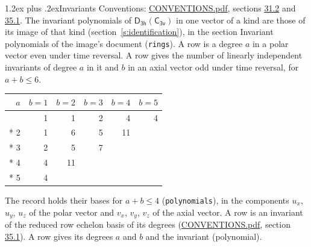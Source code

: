 \documentclass[10pt,a4paper]{article}
\makeatletter
\renewcommand\section{\@startsection{section}{1}{\z@}{-3ex plus -1ex minus -.2ex}%
  {1.2ex plus .2ex}{\normalfont\large\sffamily\bfseries\color{parttitle}}}
\numberwithin{equation}{section}
\newcommand{\grp}[1]{\mathsf{#1}}
\makeatother
\begin{document}
\section{Invariants}\label{s:invariants}
Conventions: \href{../../CONVENTIONS.pdf}{CONVENTIONS.pdf}, sections \href{../../CONVENTIONS.pdf\#conv.31.2}{31.2} and \href{../../CONVENTIONS.pdf\#conv.35.1}{35.1}.
The invariant polynomials of $\grp{D_{3h}}(\grp{C_{3v}})$ in one vector of a kind are those of its image of that kind (section~\ref{s:identification}), in the section Invariant polynomials of the image's document (\texttt{rings}).
\leavevmode\label{n:index.degree.polar}\label{n:index.degree.axial}A row is a degree $a$ in a polar vector even under time reversal. A row gives the number of linearly independent invariants of degree $a$ in it and $b$ in an axial vector odd under time reversal, for $a + b \le 6$.
{\small\begin{longtable}{@{}rrrrrr@{}}\toprule
$a$ & $b = 1$ & $b = 2$ & $b = 3$ & $b = 4$ & $b = 5$\\\midrule\endhead
\bottomrule\endfoot\endlastfoot
1 & 1 & 1 & 2 & 4 & 4\\*
2 & 1 & 6 & 5 & 11 & \\*
3 & 2 & 5 & 7 &  & \\*
4 & 4 & 11 &  &  & \\*
5 & 4 &  &  &  & \\
\bottomrule\end{longtable}}
\leavevmode\label{n:local.component.polar}\label{n:local.component.axial}The record holds their bases for $a + b \le 4$ (\texttt{polynomials}), in the components $u_{x}$, $u_{y}$, $u_{z}$ of the polar vector and $v_{x}$, $v_{y}$, $v_{z}$ of the axial vector. \label{n:head.polynomial}A row is an invariant of the reduced row echelon basis of its degrees (\href{../../CONVENTIONS.pdf}{CONVENTIONS.pdf}, section \href{../../CONVENTIONS.pdf\#conv.35.1}{35.1}). A row gives its degrees $a$ and $b$ and the invariant (polynomial).
\end{document}
